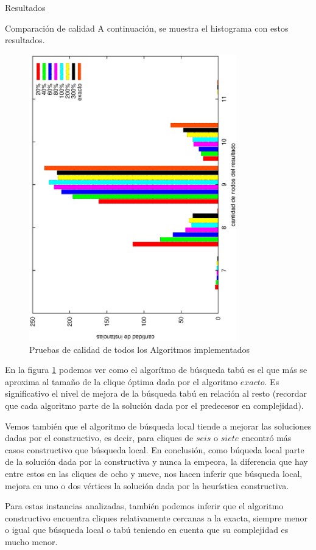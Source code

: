 \documentclass[12pt,titlepage]{article}
\begin{document}
\begin{section}{Resultados}
\begin{subsection}{Comparación de calidad}
		A continuación, se muestra el histograma con estos resultados.
		\begin{figure}[H]
			\centering
					\includegraphics[width=9cm,angle=-90]{conclusiones/calidad.eps}
			\caption{Pruebas de calidad de todos los Algoritmos implementados}
			\label{fig:Calidad de los Algoritmos}
		\end{figure}
		
		En la figura \ref{fig:Calidad de los Algoritmos} podemos ver como el algorítmo de búsqueda tabú es el que más se aproxima al tamaño de la clique óptima dada por el algoritmo $exacto$. Es significativo el nivel de mejora de la búsqueda tabú en relación al resto (recordar que cada algoritmo parte de la solución dada por el predecesor en complejidad).
		
		Vemos también que el algoritmo de búsqueda local tiende a mejorar las soluciones dadas por el constructivo, es decir, para cliques de $seis$ o $siete$ encontró más casos constructivo que búsqueda local. En conclusión, como búqueda local parte de la solución dada por la constructiva y nunca la empeora, la diferencia que hay entre estos en las cliques de ocho y nueve, nos hacen inferir que búsqueda local, mejora en uno o dos vértices la solución dada por la heurística constructiva.
		
		Para estas instancias analizadas, también podemos inferir que el algoritmo constructivo encuentra cliques relativamente cercanas a la exacta, siempre menor o igual que búsqueda local o tabú teniendo en cuenta que su complejidad es mucho menor.
		

\end{subsection}
\end{section}
\end{document}
